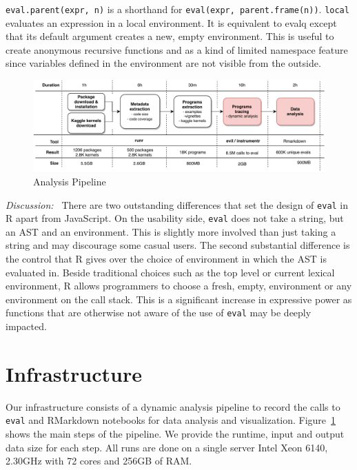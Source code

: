 \documentclass[USenglish,cleveref, autoref, thm-restate]{lipics-v2019}
\newcommand{\eval}{\texttt{eval}\xspace}
\renewcommand{\c}[1]{\lstinline{#1}\xspace}
\begin{document}
\c{eval.parent(expr, n)} is a shorthand for \c{eval(expr, parent.frame(n))}.
\c{local} evaluates an expression in a local environment. It is equivalent
to evalq except that its default argument creates a new, empty
environment. This is useful to create anonymous recursive functions and as a
kind of limited namespace feature since variables defined in the environment
are not visible from the outside.

\begin{figure}[!t]\centering\includegraphics[width=.8\linewidth]
{pipeline.pdf}\caption{Analysis Pipeline}\label{fig:pipeline}
\end{figure}

\medskip\emph{Discussion:~} There are two outstanding differences that set
the design of \eval in R apart from JavaScript. On the usability side, \eval
does not take a string, but an AST and an environment. This is slightly more
involved than just taking a string and may discourage some casual users.
The second substantial difference is the control that R gives over the
choice of environment in which the AST is evaluated in. Beside traditional
choices such as the top level or current lexical environment, R allows
programmers to choose a fresh, empty, environment or any environment on the
call stack. This is a significant increase in expressive power as functions
that are otherwise not aware of the use of \eval may be deeply impacted.

\section{Infrastructure}

Our infrastructure consists of a dynamic analysis pipeline to record the
calls to \eval and RMarkdown notebooks for data analysis and visualization.
Figure~\ref{fig:pipeline} shows the main steps of the pipeline. We provide
the runtime, input and output data size for each step. All runs are done on
a single server Intel Xeon 6140, 2.30GHz with 72 cores and 256GB of RAM.
\end{document}
